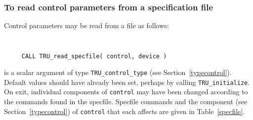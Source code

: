 \documentclass{galahad}
\newcommand{\packagename}{TRU}
\begin{document}
\subsubsection{To read control parameters from a specification file}
\label{readspec}

Control parameters may be read from a file as follows:
\hskip0.5in
\def\baselinestretch{0.8} {\tt
\begin{verbatim}
     CALL TRU_read_specfile( control, device )
\end{verbatim}
}
\def\baselinestretch{1.0}

\begin{description}
 is a scalar \intentinout argument of type
{\tt \packagename\_control\_type}
(see Section~\ref{typecontrol}).
Default values should have already been set, perhaps by calling
{\tt \packagename\_initialize}.
On exit, individual components of {\tt control} may have been changed
according to the commands found in the specfile. Specfile commands and
the component (see Section~\ref{typecontrol}) of {\tt control}
that each affects are given in Table~\ref{specfile}.


\end{description}
\end{document}
